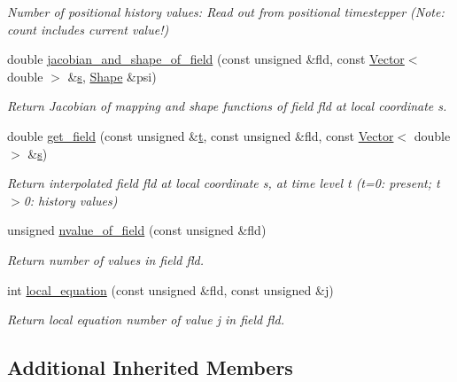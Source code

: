 \begin{DoxyCompactItemize}
\begin{DoxyCompactList}\small\item\em Number of positional history values\+: Read out from positional timestepper (Note\+: count includes current value!) \end{DoxyCompactList}\item 
double \hyperlink{classoomph_1_1ProjectableAxisymLinearElasticityElement_a86f342760e932e4ae53f0fe36d784bd0}{jacobian\+\_\+and\+\_\+shape\+\_\+of\+\_\+field} (const unsigned \&fld, const \hyperlink{classoomph_1_1Vector}{Vector}$<$ double $>$ \&\hyperlink{cfortran_8h_ab7123126e4885ef647dd9c6e3807a21c}{s}, \hyperlink{classoomph_1_1Shape}{Shape} \&psi)
\begin{DoxyCompactList}\small\item\em Return Jacobian of mapping and shape functions of field fld at local coordinate s. \end{DoxyCompactList}\item 
double \hyperlink{classoomph_1_1ProjectableAxisymLinearElasticityElement_a125b64cda7cc665d987660bccedd3c39}{get\+\_\+field} (const unsigned \&\hyperlink{cfortran_8h_af6f0bd3dc13317f895c91323c25c2b8f}{t}, const unsigned \&fld, const \hyperlink{classoomph_1_1Vector}{Vector}$<$ double $>$ \&\hyperlink{cfortran_8h_ab7123126e4885ef647dd9c6e3807a21c}{s})
\begin{DoxyCompactList}\small\item\em Return interpolated field fld at local coordinate s, at time level t (t=0\+: present; t$>$0\+: history values) \end{DoxyCompactList}\item 
unsigned \hyperlink{classoomph_1_1ProjectableAxisymLinearElasticityElement_a00715989f89c46ba103194baf8e359b2}{nvalue\+\_\+of\+\_\+field} (const unsigned \&fld)
\begin{DoxyCompactList}\small\item\em Return number of values in field fld. \end{DoxyCompactList}\item 
int \hyperlink{classoomph_1_1ProjectableAxisymLinearElasticityElement_a449c2dd77bc7f66fac46affb6223a04b}{local\+\_\+equation} (const unsigned \&fld, const unsigned \&j)
\begin{DoxyCompactList}\small\item\em Return local equation number of value j in field fld. \end{DoxyCompactList}\end{DoxyCompactItemize}
\subsection*{Additional Inherited Members}


